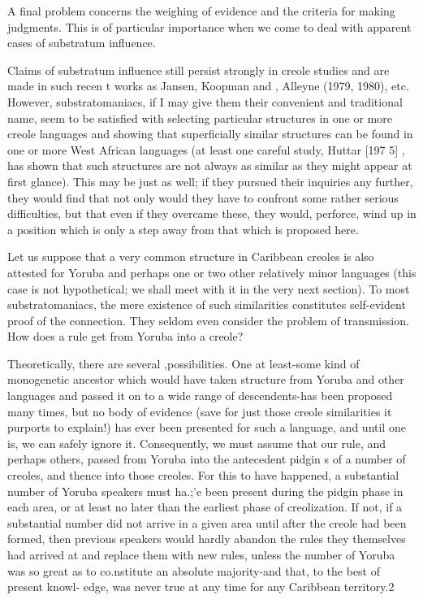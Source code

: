 
A final problem concerns the weighing of evidence and the criteria for making judgments. This is of particular importance when we come to deal with apparent cases of substratum influence.

Claims of substratum influence still persist strongly in creole studies and are made in such recen t works as Jansen, Koopman and \citet{Muysken1978}, Alleyne (1979, 1980), etc. However, substrato\-maniacs, if I may give them their convenient and traditional name, seem to be satisfied with selecting particular structures in one or more creole languages and showing that superficially similar structures can be found in one or more West African languages (at least one careful study, Huttar [197 5] , has shown that such structures are not always as similar as they might appear at first glance). This may be just as well; if they pursued their inquiries any further, they would find that not only would they have to confront some rather serious diffi\-culties, but that even if they overcame these, they would, perforce, wind up in a position which is only a step away from that which is proposed here.

Let us suppose that a very common structure in Caribbean creoles is also attested for Yoruba and perhaps one or two other rela\-tively minor languages (this case is not hypothetical; we shall meet with it in the very next section). To most substratomaniacs, the mere existence of such similarities constitutes self-evident proof of the connection. They seldom even consider the problem of transmission. How does a rule get from Yoruba into a creole?

Theoretically, there are several ,possibilities. One at least-some kind of monogenetic ancestor which would have taken structure from Yoruba and other languages and passed it on to a wide range of descen\-dents-has been proposed many times, but no body of evidence (save for just those creole similarities it purports to explain!) has ever been presented for such a language, and until one is, we can safely ignore it. Consequently, we must assume that our rule, and perhaps others, passed from Yoruba into the antecedent pidgin s of a number of creoles, and thence into those creoles. For this to have happened, a substantial number of Yoruba speakers must ha.;'e been present during the pidgin
phase in each area, or at least no later than the earliest phase of creoli\-zation. If not, if a substantial number did not arrive in a given area until after the creole had been formed, then previous speakers would hardly abandon the rules they themselves had arrived at and replace them with new rules, unless the number of Yoruba was so great as to co.nstitute an absolute majority-and that, to the best of present knowl- edge, was never true at any time for any Caribbean territory.2

